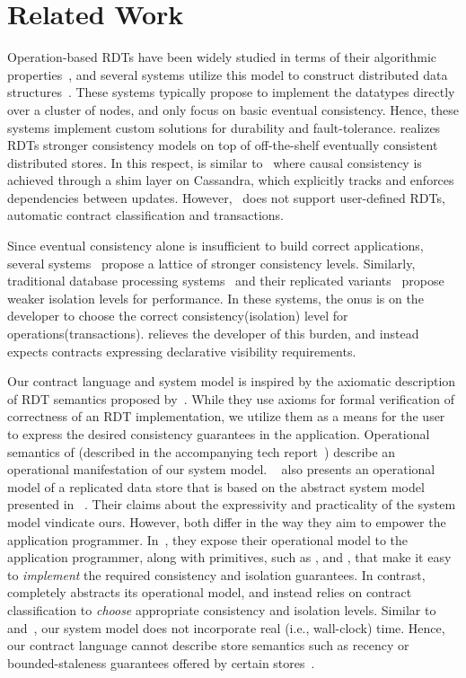 \section{Related Work}
\label{sec:related}

Operation-based RDTs have been widely studied in terms of their algorithmic
properties~\cite{SSS,Burckhardt2014}, and several systems utilize this model to
construct distributed data structures~\cite{Cassandra,Bayou,Tango}. These
systems typically propose to implement the datatypes directly over a cluster of
nodes, and only focus on basic eventual consistency. Hence, these systems
implement custom solutions for durability and fault-tolerance. \name realizes
RDTs stronger consistency models on top of off-the-shelf eventually consistent
distributed stores. In this respect, \name is similar to~\cite{BoltOn} where
causal consistency is achieved through a shim layer on Cassandra, which
explicitly tracks and enforces dependencies between updates.
However,~\cite{BoltOn} does not support user-defined RDTs, automatic contract
classification and transactions.

Since eventual consistency alone is insufficient to build correct applications,
several systems~\cite{Bayou,Pileus,RedBlue} propose a lattice of stronger
consistency levels. Similarly, traditional database processing
systems~\cite{Berenson95} and their replicated variants~\cite{BailisHAT}
propose weaker isolation levels for performance. In these systems, the onus is
on the developer to choose the correct consistency(isolation) level for
operations(transactions). \name relieves the developer of this burden, and
instead expects  contracts expressing declarative visibility requirements.

Our contract language and system model is inspired by the axiomatic description
of RDT semantics proposed by~\cite{Burckhardt2014}. While they use axioms for
formal verification of correctness of an RDT implementation, we utilize them as
a means for the user to express the desired consistency guarantees in the
application. Operational semantics of \name (described in the accompanying tech
report~\cite{techrep}) describe an operational manifestation of our system
model.  ~\cite{Burckhardt2015} also presents an operational model of a
replicated data store that is based on the abstract system model presented in
~\cite{Burckhardt2014}. Their claims about the expressivity and practicality of
the system model vindicate ours.  However, both differ in the way they aim to
empower the application programmer. In~\cite{Burckhardt2015}, they expose their
operational model to the application programmer, along with primitives, such as
,  and , that make it easy to \emph{implement} the
required consistency and isolation guarantees. In contrast, \name completely
abstracts its operational model, and instead relies on contract classification
to \emph{choose} appropriate consistency and isolation levels.  Similar
to~\cite{Burckhardt2014} and~\cite{Burckhardt2015}, our system model does not
incorporate real (i.e., wall-clock) time. Hence, our contract language cannot
describe store semantics such as recency or bounded-staleness guarantees offered
by certain stores~\cite{Pileus}.

